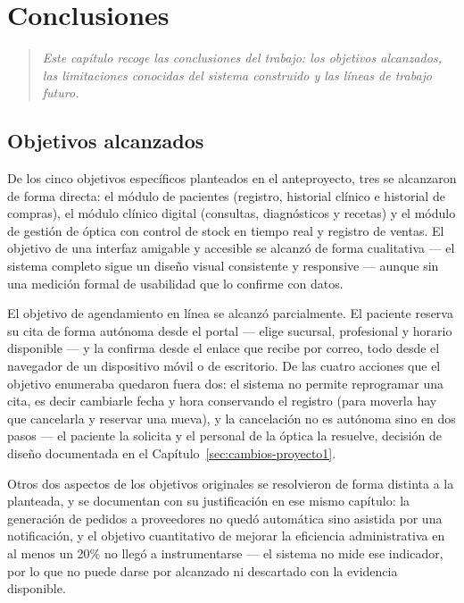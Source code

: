 \chapter{Conclusiones}
\label{sec:conclusiones}

\begin{quote}
\itshape
Este capítulo recoge las conclusiones del trabajo: los objetivos alcanzados, las limitaciones conocidas del sistema construido y las líneas de trabajo futuro.
\end{quote}

\section{Objetivos alcanzados}
\label{sec:conclusiones-objetivos}

De los cinco objetivos específicos planteados en el anteproyecto, tres se alcanzaron de forma directa: el módulo de pacientes (registro, historial clínico e historial de compras), el módulo clínico digital (consultas, diagnósticos y recetas) y el módulo de gestión de óptica con control de stock en tiempo real y registro de ventas. El objetivo de una interfaz amigable y accesible se alcanzó de forma cualitativa --- el sistema completo sigue un diseño visual consistente y responsive --- aunque sin una medición formal de usabilidad que lo confirme con datos.

El objetivo de agendamiento en línea se alcanzó parcialmente. El paciente reserva su cita de forma autónoma desde el portal --- elige sucursal, profesional y horario disponible --- y la confirma desde el enlace que recibe por correo, todo desde el navegador de un dispositivo móvil o de escritorio. De las cuatro acciones que el objetivo enumeraba quedaron fuera dos: el sistema no permite reprogramar una cita, es decir cambiarle fecha y hora conservando el registro (para moverla hay que cancelarla y reservar una nueva), y la cancelación no es autónoma sino en dos pasos --- el paciente la solicita y el personal de la óptica la resuelve, decisión de diseño documentada en el Capítulo~\ref{sec:cambios-proyecto1}.

Otros dos aspectos de los objetivos originales se resolvieron de forma distinta a la planteada, y se documentan con su justificación en ese mismo capítulo: la generación de pedidos a proveedores no quedó automática sino asistida por una notificación, y el objetivo cuantitativo de mejorar la eficiencia administrativa en al menos un 20\% no llegó a instrumentarse --- el sistema no mide ese indicador, por lo que no puede darse por alcanzado ni descartado con la evidencia disponible.

